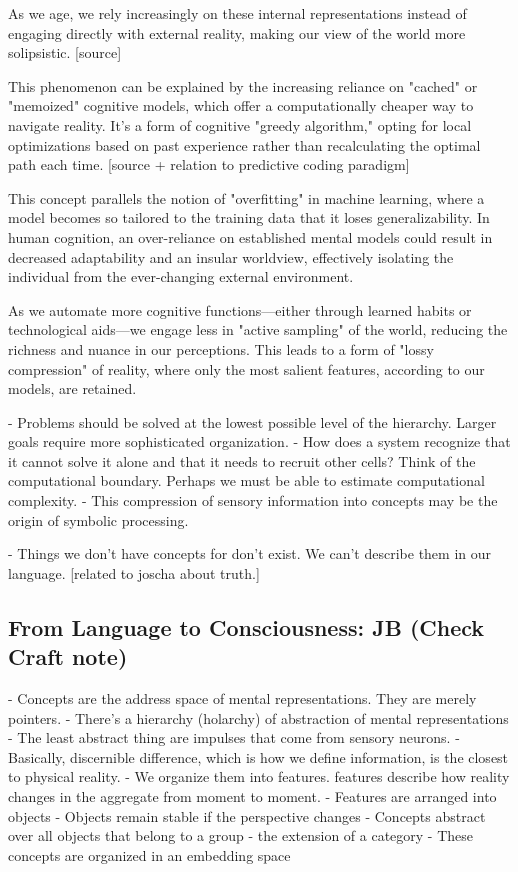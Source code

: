 As we age, we rely increasingly on these internal representations instead of engaging directly with external reality, making our view of the world more solipsistic. [source]

This phenomenon can be explained by the increasing reliance on "cached" or "memoized" cognitive models, which offer a computationally cheaper way to navigate reality. It's a form of cognitive "greedy algorithm," opting for local optimizations based on past experience rather than recalculating the optimal path each time. [source + relation to predictive coding paradigm]

This concept parallels the notion of "overfitting" in machine learning, where a model becomes so tailored to the training data that it loses generalizability. In human cognition, an over-reliance on established mental models could result in decreased adaptability and an insular worldview, effectively isolating the individual from the ever-changing external environment.

As we automate more cognitive functions—either through learned habits or technological aids—we engage less in "active sampling" of the world, reducing the richness and nuance in our perceptions. This leads to a form of "lossy compression" of reality, where only the most salient features, according to our models, are retained.


- Problems should be solved at the lowest possible level of the hierarchy. Larger goals require more sophisticated organization.
- How does a system recognize that it cannot solve it alone and that it needs to recruit other cells? Think of the computational boundary. Perhaps we must be able to estimate computational complexity. 
- This compression of sensory information into concepts may be the origin of symbolic processing. 

- Things we don't have concepts for don't exist. We can't describe them in our language. [related to joscha about truth.] 




\subsection{From Language to Consciousness: JB (Check Craft note)}
- Concepts are the address space of mental representations. They are merely pointers. 
- There's a hierarchy (holarchy) of abstraction of mental representations
- The least abstract thing are impulses that come from sensory neurons. 
- Basically, discernible difference, which is how we define information, is the closest to physical reality.
- We organize them into features. features describe how reality changes in the aggregate from moment to moment.
- Features are arranged into objects
- Objects remain stable if the perspective changes
- Concepts abstract over all objects that belong to a group - the extension of a category
- These concepts are organized in an embedding space


